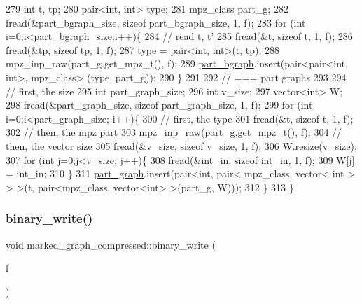 \begin{DoxyCode}
279   \textcolor{keywordtype}{int} t, tp;
280   pair<int, int> type; 
281   mpz\_class part\_g; 
282   fread(&part\_bgraph\_size, \textcolor{keyword}{sizeof} part\_bgraph\_size, 1, f);
283   \textcolor{keywordflow}{for} (\textcolor{keywordtype}{int} i=0;i<part\_bgraph\_size;i++)\{
284     \textcolor{comment}{// read t, t'}
285     fread(&t, \textcolor{keyword}{sizeof} t, 1, f);
286     fread(&tp, \textcolor{keyword}{sizeof} tp, 1, f);
287     type = pair<int, int>(t, tp);
288     mpz\_inp\_raw(part\_g.get\_mpz\_t(), f);
289     \hyperlink{classmarked__graph__compressed_a7b3267063fba30b45eb21b3ba4e07536}{part\_bgraph}.insert(pair<pair<int, int>, mpz\_class> (type, part\_g));
290   \}
291 
292   \textcolor{comment}{// === part graphs}
293 
294   \textcolor{comment}{// first, the size}
295   \textcolor{keywordtype}{int} part\_graph\_size;
296   \textcolor{keywordtype}{int} v\_size;
297   vector<int> W; 
298   fread(&part\_graph\_size, \textcolor{keyword}{sizeof} part\_graph\_size, 1, f);
299   \textcolor{keywordflow}{for} (\textcolor{keywordtype}{int} i=0;i<part\_graph\_size; i++)\{
300     \textcolor{comment}{// first, the type}
301     fread(&t, \textcolor{keyword}{sizeof} t, 1, f);
302     \textcolor{comment}{// then, the mpz part}
303     mpz\_inp\_raw(part\_g.get\_mpz\_t(), f);
304     \textcolor{comment}{// then, the vector size}
305     fread(&v\_size, \textcolor{keyword}{sizeof} v\_size, 1, f);
306     W.resize(v\_size);
307     \textcolor{keywordflow}{for} (\textcolor{keywordtype}{int} j=0;j<v\_size; j++)\{
308       fread(&int\_in, \textcolor{keyword}{sizeof} int\_in, 1, f);
309       W[j] = int\_in;
310     \}
311     \hyperlink{classmarked__graph__compressed_ae179a4737e6eab905c18a94d44ef64b7}{part\_graph}.insert(pair<\textcolor{keywordtype}{int}, pair< mpz\_class, vector< int > > >(t, pair<mpz\_class, vector<int>
       >(part\_g, W)));
312   \}
313 \}
\end{DoxyCode}
\mbox{\label{classmarked__graph__compressed_ab9cdb7fc43badd58fb5202f74ffac723}} 
\subsubsection{\texorpdfstring{binary\+\_\+write()}{binary\_write()}}
{\footnotesize\ttfamily void marked\+\_\+graph\+\_\+compressed\+::binary\+\_\+write (\begin{DoxyParamCaption}\item[{F\+I\+LE $\ast$}]{f }\end{DoxyParamCaption})}



